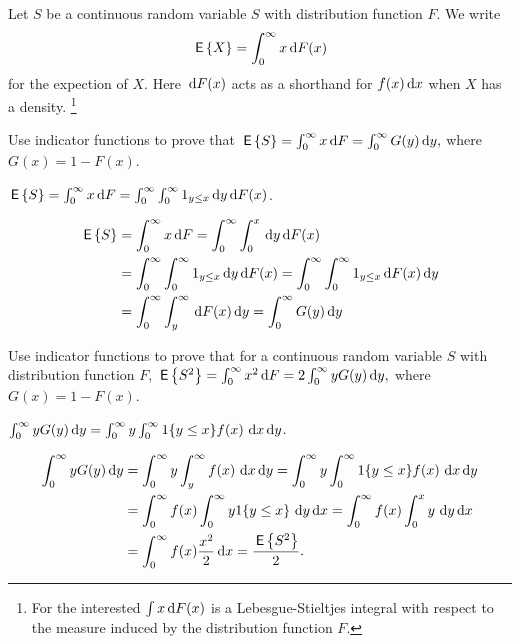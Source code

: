 Let $S$ be a continuous random variable $S$ with distribution function $F$.  We write 
\begin{equation*}
  \,\mathsf{E}\left\{X\right\} = \int_0^\infty x \,\text{d}F(x)
\end{equation*}
for the expection of $X$. Here $\,\text{d}F(x)$ acts as a shorthand for $f(x) \,\text{d}x$ when $X$ has a density. \footnote{For the interested $\int x \,\text{d}F(x)$ is a Lebesgue-Stieltjes integral with respect to the measure induced by the distribution function $F$.}

\begin{exercise}
 Use indicator functions to prove that 
$   \,\mathsf{E}\left\{S\right\} = \int_0^\infty x \,\text{d}F  = \int_0^\infty G(y) \,\text{d}y,$
where $G(x) = 1 - F(x)$. 
\begin{hint}
$\,\mathsf{E}\left\{S\right\} = \int_0^\infty x \,\text{d}F  = \int_0^\infty \int_0^\infty 1_{y\leq x} \,\text{d}y \,\text{d}F(x)$.
\end{hint}
\begin{solution}
\begin{equation*}
  \begin{split}
    \,\mathsf{E}\left\{S\right\} &= \int_0^\infty x \,\text{d}F  = \int_0^\infty \int_0^x \,\text{d}y \,\text{d}F(x) \\
    & = \int_0^\infty \int_0^\infty 1_{y\leq x} \,\text{d}y \,\text{d}F(x)   = \int_0^\infty \int_0^\infty 1_{y\leq x} \,\text{d}F(x) \,\text{d}y\\
    & = \int_0^\infty \int_y^\infty \,\text{d}F(x) \,\text{d}y = \int_0^\infty G(y) \,\text{d}y
  \end{split}
\end{equation*}
\end{solution}
\end{exercise}

\begin{exercise}
 Use indicator functions to prove that for  a continuous random
    variable $S$ with distribution function $F$, 
$    \,\mathsf{E}\left\{S^2\right\} = \int_0^\infty x^2 \,\text{d}F  = 2 \int_0^\infty y G(y) \,\text{d}y,$
where $G(x) = 1 - F(x)$. 
\begin{hint}
$\int_0^\infty y G(y) \,\text{d}y = \int_0^\infty y \int_0^\infty 1\{y\leq x\}f(x)\, \,\text{d}x \,\text{d}y$.
\end{hint}
\begin{solution}
  \begin{equation*}
    \begin{split}
\int_0^\infty y G(y) \,\text{d}y 
&=  \int_0^\infty y \int_y^\infty f(x)\, \,\text{d}x \,\text{d}y =  \int_0^\infty y \int_0^\infty 1\{y\leq x\}f(x)\, \,\text{d}x \,\text{d}y\\
&=  \int_0^\infty f(x) \int_0^\infty y 1\{y \leq x\}\, \,\text{d}y \,\text{d}x
=  \int_0^\infty f(x) \int_0^x y\, \,\text{d}y \,\text{d}x\\
&=  \int_0^\infty f(x) \frac{x^2}2 \,\text{d}x =\frac{\,\mathsf{E}\left\{S^2\right\}}2.
    \end{split}
  \end{equation*}
\end{solution}
\end{exercise}

